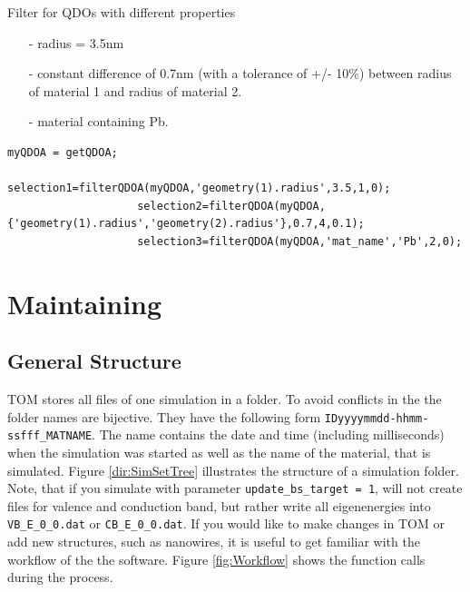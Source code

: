 				\begin{EXAMPLE}
					Filter for QDOs with different properties
					\begin{itemize}
					\item[-] radius = 3.5nm
					\item[-] constant difference of 0.7nm (with a tolerance of +/- 10\%) between radius of material 1 and radius of material 2.
					\item[-] material containing Pb.
					\end{itemize}
					\begin{lstlisting}[frame = none]
					myQDOA = getQDOA;
					selection1=filterQDOA(myQDOA,'geometry(1).radius',3.5,1,0);
					selection2=filterQDOA(myQDOA, {'geometry(1).radius','geometry(2).radius'},0.7,4,0.1);
					selection3=filterQDOA(myQDOA,'mat_name','Pb',2,0); \end{lstlisting}
				\end{EXAMPLE}
			 
	
	\section{Maintaining \software}
		\subsection{General Structure} \label{sec:SoftwareStructure}
			\gls{TOM} stores all files of one simulation in a folder. To avoid conflicts in the the folder names are bijective. They
			have the following form \lstinline{IDyyyymmdd-hhmm-ssfff_MATNAME}. The name contains the date and time (including milliseconds)
			when the simulation was started as well as the name of the material, that is simulated. Figure \ref{dir:SimSetTree} illustrates
			the structure of a simulation folder. Note, that if you simulate with parameter \lstinline{update_bs_target = 1}, \omen will
			not create files for valence and conduction band, but rather write all eigenenergies into \lstinline{VB_E_0_0.dat} or
			\lstinline{CB_E_0_0.dat}.
			If you would like to make changes in \gls{TOM} or add new structures, such as nanowires, it is useful to get familiar with the
			workflow of the the software. Figure \ref{fig:Workflow} shows the function calls during the process.
		
